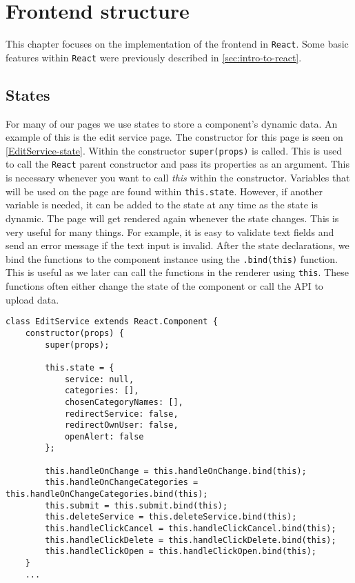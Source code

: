 \section{Frontend structure}
This chapter focuses on the implementation of the frontend in \texttt{React}.
Some basic features within \texttt{React} were previously described in \autoref{sec:intro-to-react}.


\subsection{States}
For many of our pages we use states to store a component's dynamic data. 
An example of this is the edit service page. 
The constructor for this page is seen on \autoref{EditService-state}.
Within the constructor \texttt{super(props)} is called. 
This is used to call the \texttt{React} parent constructor and pass its properties as an argument.
This is necessary whenever you want to call \textit{this} within the constructor.
Variables that will be used on the page are found within \texttt{this.state}. 
However, if another variable is needed, it can be added to the state at any time as the state is dynamic.
The page will get rendered again whenever the state changes. 
This is very useful for many things. 
For example, it is easy to validate text fields and send an error message if the text input is invalid.  
After the state declarations, we bind the functions to the component instance using the \texttt{.bind(this)} function.
This is useful as we later can call the functions in the renderer using \texttt{this}.
These functions often either change the state of the component or call the API to upload data.
\begin{lstlisting}[caption={Constructor and state for edit service}, captionpos=b, label={EditService-state}]
class EditService extends React.Component {
    constructor(props) {
        super(props);
    
        this.state = {
            service: null,
            categories: [],
            chosenCategoryNames: [],
            redirectService: false,
            redirectOwnUser: false,
            openAlert: false
        };
            
        this.handleOnChange = this.handleOnChange.bind(this);
        this.handleOnChangeCategories = this.handleOnChangeCategories.bind(this);
        this.submit = this.submit.bind(this);
        this.deleteService = this.deleteService.bind(this);
        this.handleClickCancel = this.handleClickCancel.bind(this);
        this.handleClickDelete = this.handleClickDelete.bind(this);
        this.handleClickOpen = this.handleClickOpen.bind(this);
    }
    ...
\end{lstlisting}

